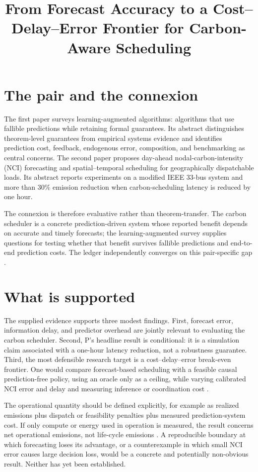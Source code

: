 \documentclass{article}
\title{From Forecast Accuracy to a Cost--Delay--Error Frontier for Carbon-Aware Scheduling}
\begin{document}
\maketitle

\section{The pair and the connexion}

The first paper surveys learning-augmented algorithms: algorithms that use fallible predictions while retaining formal guarantees.  Its abstract distinguishes theorem-level guarantees from empirical systems evidence and identifies prediction cost, feedback, endogenous error, composition, and benchmarking as central concerns.  The second paper proposes day-ahead nodal-carbon-intensity (NCI) forecasting and spatial--temporal scheduling for geographically dispatchable loads.  Its abstract reports experiments on a modified IEEE 33-bus system and more than \(30\%\) emission reduction when carbon-scheduling latency is reduced by one hour.

The connexion is therefore evaluative rather than theorem-transfer.  The carbon scheduler is a concrete prediction-driven system whose reported benefit depends on accurate and timely forecasts; the learning-augmented survey supplies questions for testing whether that benefit survives fallible predictions and end-to-end prediction costs.  The ledger independently converges on this pair-specific gap .

\section{What is supported}

The supplied evidence supports three modest findings.  First, forecast error, information delay, and predictor overhead are jointly relevant to evaluating the carbon scheduler.  Second, P's headline result is conditional: it is a simulation claim associated with a one-hour latency reduction, not a robustness guarantee.  Third, the most defensible research target is a cost--delay--error break-even frontier.  One would compare forecast-based scheduling with a feasible causal prediction-free policy, using an oracle only as a ceiling, while varying calibrated NCI error and delay and measuring inference or coordination cost .

The operational quantity should be defined explicitly, for example as realized emissions plus dispatch or feasibility penalties plus measured prediction-system cost.  If only compute or energy used in operation is measured, the result concerns net operational emissions, not life-cycle emissions .  A reproducible boundary at which forecasting loses its advantage, or a counterexample in which small NCI error causes large decision loss, would be a concrete and potentially non-obvious result.  Neither has yet been established.
\end{document}
